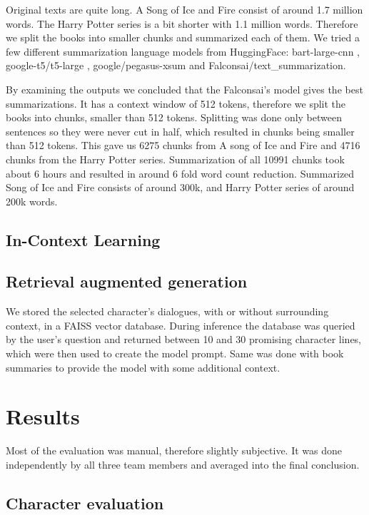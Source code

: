 \documentclass[fleqn,moreauthors,10pt]{ds_report}
\begin{document}
Original texts are quite long. A Song of Ice and Fire consist of around 1.7 million words.
The Harry Potter series is a bit shorter with 1.1 million words.
Therefore we split the books into smaller chunks and summarized each of them.
We tried a few different summarization language models from HuggingFace:
bart-large-cnn \cite{bart_large}, google-t5/t5-large \cite{2020t5}, google/pegasus-xsum \cite{zhang2019pegasus} and Falconsai/text\_summarization.

By examining the outputs we concluded that the Falconsai's model gives the best summarizations.
It has a context window of 512 tokens, therefore we split the books into chunks, smaller than 512 tokens.
Splitting was done only between sentences so they were never cut in half, which resulted in chunks being smaller than 512 tokens.
This gave us 6275 chunks from A song of Ice and Fire and 4716 chunks from the Harry Potter series.
Summarization of all 10991 chunks took about 6 hours and resulted in around 6 fold word count reduction. Summarized Song of Ice and Fire consists of around 300k, and Harry Potter series of around 200k words.

\subsection{In-Context Learning}

\subsection*{Retrieval augmented generation}
We stored the selected character's dialogues, with or without surrounding context, in a FAISS vector database.
During inference the database was queried by the user's question and returned between 10 and 30 promising character lines,
which were then used to create the model prompt.
Same was done with book summaries to provide the model with some additional context.




\section*{Results}
Most of the evaluation was manual, therefore slightly subjective.
It was done independently by all three team members and averaged into the final conclusion.

\subsection*{Character evaluation}
\end{document}
